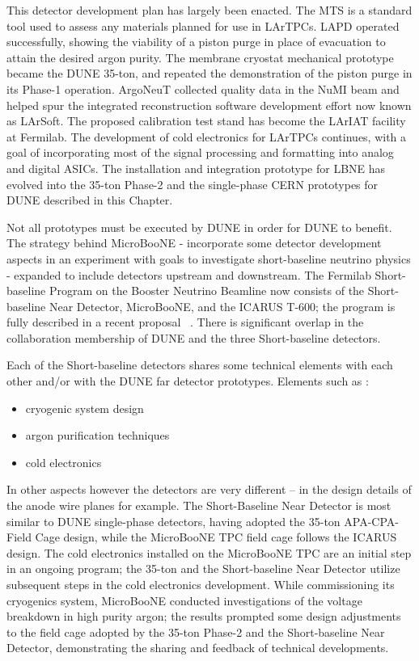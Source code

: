 This detector development plan has largely been enacted.  The MTS is a standard tool used to assess any materials planned for use in LArTPCs.  LAPD operated successfully, showing the viability of a piston purge in place of evacuation to attain the desired argon purity.  The membrane cryostat mechanical prototype became the DUNE 35-ton, and repeated the demonstration of the piston purge in its Phase-1 operation.  ArgoNeuT collected quality data in the NuMI beam and helped spur the integrated reconstruction software development effort now known as LArSoft.  The proposed calibration test stand has become the LArIAT facility at Fermilab.  The development of cold electronics for LArTPCs continues, with a goal of incorporating most of the signal processing and formatting into analog and digital ASICs.  The installation and integration prototype for LBNE has evolved into the 35-ton Phase-2 and the single-phase CERN prototypes for DUNE described in this Chapter.
 
Not all prototypes must be executed by DUNE in order for DUNE to benefit.  The strategy behind MicroBooNE - incorporate some detector development aspects in an experiment with goals to investigate short-baseline neutrino physics - expanded to include detectors upstream and downstream.  The Fermilab Short-baseline Program on the Booster Neutrino Beamline now consists of the Short-baseline Near Detector, MicroBooNE, and the ICARUS T-600; the program is fully described in a recent proposal~ \cite{SBN}.  There is significant overlap in the collaboration membership of DUNE and the three Short-baseline detectors.
 
Each of the Short-baseline detectors shares some technical elements with each other and/or with the DUNE far detector prototypes. Elements such as :
\begin{itemize}
\item cryogenic system design
\item argon purification techniques
\item cold electronics
\end{itemize}
In other aspects however the detectors are very different -- in the design details of the anode wire planes for example.  The Short-Baseline Near Detector is most similar to DUNE single-phase detectors, having adopted the 35-ton APA-CPA-Field Cage design, while the MicroBooNE TPC field cage follows the ICARUS design.  The cold electronics installed on the MicroBooNE TPC are an initial step in an ongoing program; the 35-ton and the Short-baseline Near Detector utilize subsequent steps in the cold electronics development.  While commissioning its cryogenics system, MicroBooNE conducted investigations of the voltage breakdown in high purity argon; the results prompted some design adjustments to the field cage adopted by the 35-ton Phase-2 and the Short-baseline Near Detector, demonstrating the sharing and feedback of technical developments.  

